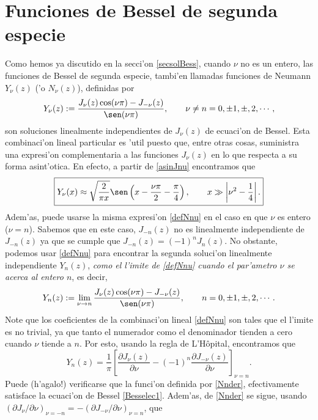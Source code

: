 \section{Funciones de Bessel de segunda especie}\label{sec:FB2E}
Como hemos ya discutido en la secci'on \ref{secsolBess}, cuando $\nu$ no es un entero, las funciones de Bessel de segunda especie, tambi'en llamadas funciones de Neumann $Y_\nu(z)$ ('o $N_\nu(z)$), definidas por
\begin{equation}\label{defNnu}
Y_\nu (z):=  \frac{J_\nu(z) \cos(\nu \pi) - J_{-\nu}(z)}{\sen(\nu \pi)} , \qquad \nu\neq n=0, \pm 1, \pm, 2, \cdots,
\end{equation}
son soluciones linealmente independientes de $J_\nu(z)$ de ecuaci'on de Bessel. Esta combinaci'on lineal particular es 'util puesto que, entre otras cosas, suministra una expresi'on complementaria a las funciones $J_\nu(z)$ en lo que respecta a su forma asint'otica. En efecto, a partir de \eqref{asinJnu} encontramos que
\begin{equation}\label{asinNnu}
\boxed{Y_\nu(x)\approx \sqrt{\frac{2}{\pi x}}\sen\left(x-\frac{\nu\pi}{2}-\frac{\pi}{4}\right), 
\qquad x\gg\left|\nu^2-\frac{1}{4}\right|.}
\end{equation}
Adem'as, puede usarse la misma expresi'on \eqref{defNnu} en el caso en que $\nu$ es entero ($\nu=n$). Sabemos que en este caso, $J_{-n}(z)$ no es linealmente independiente de $J_{-n}(z)$ ya que se cumple que $J_{-n}(z)=(-1)^nJ_n(z)$. No obstante, podemos usar \eqref{defNnu} para encontrar la segunda soluci'on linealmente independiente $Y_n(z)$, \textit{como el l'imite de \eqref{defNnu} cuando el par'ametro $\nu$ se acerca al entero $n$}, es decir,
\begin{equation}\label{Nnlim}
Y_n(z):=  \lim_{\nu\to n}\frac{J_\nu(z) \cos(\nu \pi) - J_{-\nu}(z)}{\sen(\nu \pi)} , \qquad n=0, \pm 1, \pm, 2, \cdots .
\end{equation}
Note que los coeficientes de la combinaci'on lineal \eqref{defNnu} son tales que el l'imite es no trivial, ya que tanto el numerador como el denominador tienden a cero cuando $\nu$ tiende a $n$. Por esto, usando la regla de L'H\^opital, encontramos que
\begin{equation}\label{Nnder}
Y_n(z)=\frac{1}{\pi}\left[\frac{\partial J_\nu(z)}{\partial\nu}-(-1)^n\frac{\partial J_{-\nu}(z)}{\partial\nu}\right]_{\nu=n}.
\end{equation}
Puede (h'agalo!) verificarse que la funci'on definida por \eqref{Nnder}, efectivamente satisface la ecuaci'on de Bessel \eqref{Besselec1}. Adem'as, de \eqref{Nnder} se sigue, usando $(\partial J_\nu/\partial\nu)_{\nu=-n}=-(\partial J_{-\nu}/\partial\nu)_{\nu=n}$, que
